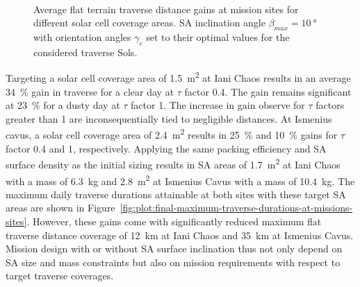 \documentclass[twocolumn,letterpaper]{IEEEAerospaceCLS}  %
\newcommand{\refFig}[1]{{Figure}~\ref{#1}} %
\newlength{\subfigureWidth}
\begin{document}
\begin{figure}[h]
\begin{subfigure}[t]{\subfigureWidth}
    \label{fig:plot:sub:iani-chaos-flat-traverse-gains-for-different-sa-area}
    \end{subfigure}\\[0.8ex]
    \caption{Average flat terrain traverse distance gains at mission sites for different solar cell coverage areas. \ac{SA} inclination angle $\beta_{max} = \SI{10}{\degree}$ with orientation angles $\gamma_{c}$ set to their optimal values for the considered traverse Sols.}
    \label{fig:plot:flat-traverse-gains-for-different-sa-area}
\end{figure}

Targeting a solar cell coverage area of \SI{1.5}{m^{2}} at Iani Chaos results in an average \SI{34}{\percent} gain in traverse for a clear day at $\tau$ factor 0.4. The gain remains significant at \SI{23}{\percent} for a dusty day at $\tau$ factor 1. The increase in gain observe for $\tau$ factors greater than 1 are inconsequentially tied to negligible distances. At Ismenius cavus, a solar cell coverage area of \SI{2.4}{m^{2}} results in \SI{25}{\percent} and \SI{10}{\percent} gains for $\tau$ factor 0.4 and 1, respectively. Applying the same packing efficiency and \ac{SA} surface density as the initial sizing results in \ac{SA} areas of \SI{1.7}{m^{2}} at Iani Chaos with a mass of \SI{6.3}{\kilo\gram} and \SI{2.8}{m^{2}} at Ismenius Cavus with a mass of \SI{10.4}{\kilo\gram}. The maximum daily traverse durations attainable at both sites with these target \ac{SA} areas are shown in \refFig{fig:plot:final-maximum-traverse-durations-at-missions-sites}. However, these gains come with significantly reduced maximum flat traverse distance coverage of \SI{12}{\kilo\meter} at Iani Chaos and \SI{35}{\kilo\meter} at Ismenius Cavus. Mission design with or without \ac{SA} surface inclination thus not only depend on \ac{SA} size and mass constraints but also on mission requirements with respect to target traverse coverages.
\end{document}
